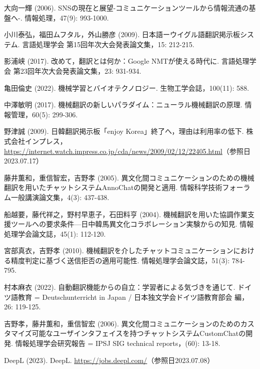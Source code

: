 \documentclass[b5paper,12pt,dvipdfmx]{jsreport}
\begin{document}
\begin{thebibliography}{99}

大向一輝 (2006). SNSの現在と展望-コミュニケーションツールから情報流通の基盤へ-. 情報処理，47(9): 993-1000.

小川泰弘，福田ムフタル，外山勝彦 (2009). 日本語ーウイグル語翻訳掲示板システム. 言語処理学会 第15回年次大会発表論文集，15: 212-215.

影浦峡 (2017). 改めて，翻訳とは何か：Google NMTが使える時代に. 言語処理学会 第23回年次大会発表論文集，23: 931-934.

亀田倫史 (2022). 機械学習とバイオテクノロジー. 生物工学会誌，100(11): 588.

中澤敏明 (2017). 機械翻訳の新しいパラダイム：ニューラル機械翻訳の原理. 情報管理，60(5): 299-306.

野津誠 (2009). 日韓翻訳掲示板「enjoy Korea」終了へ，理由は利用率の低下. 株式会社インプレス，\url{https://internet.watch.impress.co.jp/cda/news/2009/02/12/22405.html}（参照日2023.07.17）

藤井薫和，重信智宏，吉野孝 (2005). 異文化間コミュニケーションのための機械翻訳を用いたチャットシステムAnnoChatの開発と適用. 情報科学技術フォーラム一般講演論文集，4(3): 437-438.

船越要，藤代祥之，野村早恵子，石田料亨 (2004). 機械翻訳を用いた協調作業支援ツールへの要求条件—日中韓馬異文化コラボレーション実験からの知見. 情報処理学会論文誌，45(1): 112-120.


宮部真衣，吉野孝 (2010). 機械翻訳を介したチャットコミュニケーションにおける精度判定に基づく送信拒否の適用可能性. 情報処理学会論文誌，51(3): 784-795.

村本麻衣 (2022). 自動翻訳機能からの自立：学習者による気づきを通じて. ドイツ語教育 = Deutschunterricht in Japan / 日本独文学会ドイツ語教育部会 編，26: 119-125.

吉野孝，藤井薫和，重信智宏 (2006). 異文化間コミュニケーションのためのカスタマイズ可能なユーザインタフェイスを持つチャットシステムCustomChatの開発. 情報処理学会研究報告 = IPSJ SIG technical reports，(60): 13-18.

DeepL (2023). DeepL. \url{https://jobs.deepl.com/}（参照日2023.07.08）


\end{thebibliography}
\end{document}
